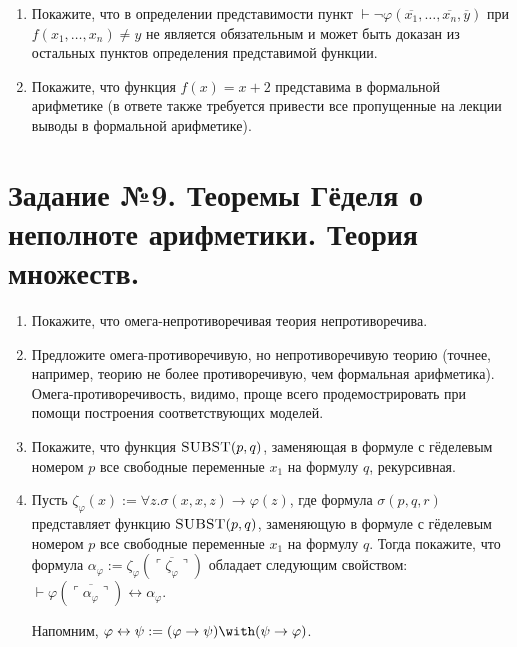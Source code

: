 \documentclass[10pt,a4paper,oneside]{article}
\begin{document}
\begin{enumerate}
\item Покажите, что в определении представимости пункт
$\vdash\neg\varphi(\overline{x_1},\dots,\overline{x_n},\overline{y})$ при $f(x_1,\dots,x_n) \ne y$ не является
обязательным и может быть доказан из остальных пунктов определения представимой функции.

\item Покажите, что функция $f(x) = x+2$ представима в формальной арифметике (в ответе также требуется привести все пропущенные
на лекции выводы в формальной арифметике).
\end{enumerate}


\section*{Задание №9. Теоремы Гёделя о неполноте арифметики. Теория множеств.}

\begin{enumerate}
\item Покажите, что омега-непротиворечивая теория непротиворечива.
\item Предложите омега-противоречивую, но непротиворечивую теорию (точнее, например, теорию не более противоречивую,
чем формальная арифметика). Омега-противоречивость, видимо, проще всего продемострировать при помощи построения соответствующих моделей.
\item Покажите, что функция $\textsc{SUBST}(p,q)$, заменяющая в формуле с гёделевым номером $p$
все свободные переменные $x_1$ на формулу $q$, рекурсивная.
\item Пусть $\zeta_\varphi(x) := \forall z.\sigma (x,x,z) \rightarrow \varphi(z)$,
где формула $\sigma(p,q,r)$ представляет функцию $\textsc{SUBST}(p,q)$, заменяющую в формуле с гёделевым номером $p$
все свободные переменные $x_1$ на формулу $q$. Тогда покажите, что формула $\alpha_\varphi := \zeta_\varphi(\overline{\ulcorner\zeta_\varphi\urcorner})$
обладает следующим свойством: $\vdash \varphi(\overline{\ulcorner\alpha_\varphi\urcorner}) \leftrightarrow \alpha_\varphi$.

Напомним, $\varphi\leftrightarrow\psi := (\varphi\rightarrow\psi)\with(\psi\rightarrow\varphi)$.
\end{enumerate}
\end{document}
